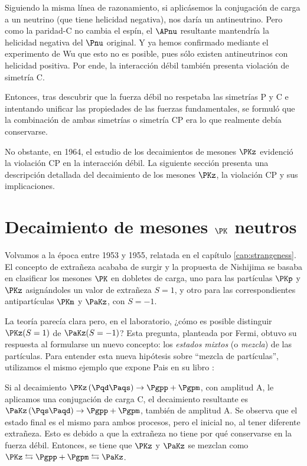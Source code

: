 Siguiendo la misma línea de razonamiento, si aplicásemos la conjugación de carga a un neutrino (que tiene helicidad negativa), nos daría un antineutrino. Pero como la paridad-C no cambia el espín, el $\APnu$ resultante mantendría la helicidad negativa del $\Pnu$ original. Y ya hemos confirmado mediante el experimento de Wu que esto no es posible, pues sólo existen antineutrinos con helicidad positiva. Por ende, la interacción débil también presenta violación de simetría C.

Entonces, tras descubrir que la fuerza débil no respetaba las simetrías P y C e intentando unificar las propiedades de las fuerzas fundamentales, se formuló que la combinación de ambas simetrías o simetría CP era lo que realmente debía conservarse.

No obstante, en 1964, el estudio de los decaimientos de mesones $\PKz$ evidenció la violación CP en la interacción débil. La siguiente sección presenta una descripción detallada del decaimiento de los mesones $\PKz$, la violación CP y sus implicaciones.

\section{Decaimiento de mesones $\PK$ neutros}
\label{sec:neutral_kaon_decay}

Volvamos a la época entre 1953 y 1955, relatada en el capítulo \ref{cap:strangeness}. El concepto de extrañeza acababa de surgir y la propuesta de Nishijima se basaba en clasificar los mesones $\PK$ en dobletes de carga, uno para las partículas $\PKp$ y $\PKz$ asignándoles un valor de extrañeza $S=1$, y otro para las correspondientes antipartículas $\PKm$ y $\PaKz$, con $S=-1$.

La teoría parecía clara pero, en el laboratorio, ¿cómo es posible distinguir $\PKz(S=1)$ de $\PaKz(S=-1)$? Esta pregunta, planteada por Fermi, obtuvo su respuesta al formularse un nuevo concepto: los \textit{estados mixtos} (o \textit{mezcla}) de las partículas. Para entender esta nueva hipótesis sobre ``mezcla de partículas'', utilizamos el mismo ejemplo que expone Pais en su libro \cite{Pais}:

Si al decaimiento $\PKz \left(\Pqd\Paqs\right) \rightarrow \Pgpp + \Pgpm$, con amplitud A, le aplicamos una conjugación de carga C, el decaimiento resultante es $\PaKz \left(\Pqs\Paqd\right) \rightarrow \Pgpp + \Pgpm$, también de amplitud A. Se observa que el estado final es el mismo para ambos procesos, pero el inicial no, al tener diferente extrañeza. Esto es debido a que la extrañeza no tiene por qué conservarse en la fuerza débil. Entonces, se tiene que $\PKz$ y $\PaKz$ se mezclan como $\PKz \leftrightarrows \Pgpp + \Pgpm \leftrightarrows \PaKz$.

